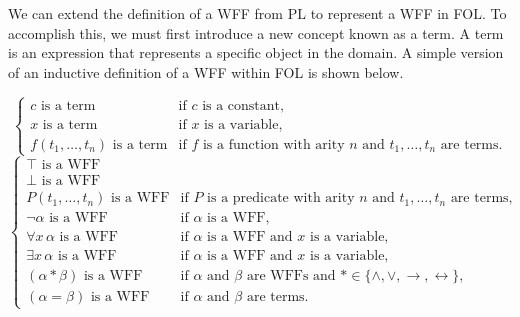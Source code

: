 \begin{table}[h!]
    \centering
    \caption{Quantifiers in First-Order Logic}
    \label{tab:quant}
\end{table}

We can extend the definition of a \gls{WFF} from \gls{PL} to represent a \gls{WFF} in \gls{FOL}. To accomplish this, we must first introduce a new concept known as a term. A term is an expression that represents a specific object in the domain. A simple version of an inductive definition of a \gls{WFF} within \gls{FOL} is shown below. 

\[
\left\{
\begin{array}{ll}
c \text{ is a term} & \text{if } c \text{ is a constant,} \\
x \text{ is a term} & \text{if } x \text{ is a variable,} \\
f(t_1, \dots, t_n) \text{ is a term} & \text{if } f \text{ is a function with arity } n \text{ and } t_1, \dots, t_n \text{ are terms.}
\end{array}
\right.
\]
\[
\left\{
\begin{array}{ll}
\top \text{ is a WFF} & \\
\bot \text{ is a WFF} & \\
P(t_1, \dots, t_n) \text{ is a WFF} & \text{if } P \text{ is a predicate with arity } n \text{ and } t_1, \dots, t_n \text{ are terms,} \\
\neg \alpha \text{ is a WFF} & \text{if } \alpha \text{ is a WFF,} \\
\forall x \, \alpha \text{ is a WFF} & \text{if } \alpha \text{ is a WFF and } x \text{ is a variable,} \\
\exists x \, \alpha \text{ is a WFF} & \text{if } \alpha \text{ is a WFF and } x \text{ is a variable,} \\
(\alpha * \beta) \text{ is a WFF} & \text{if } \alpha \text{ and } \beta \text{ are WFFs and } * \in \{\land, \lor, \rightarrow, \leftrightarrow\}, \\
(\alpha = \beta) \text{ is a WFF} & \text{if } \alpha \text{ and } \beta \text{ are terms.}
\end{array}
\right.
\]


